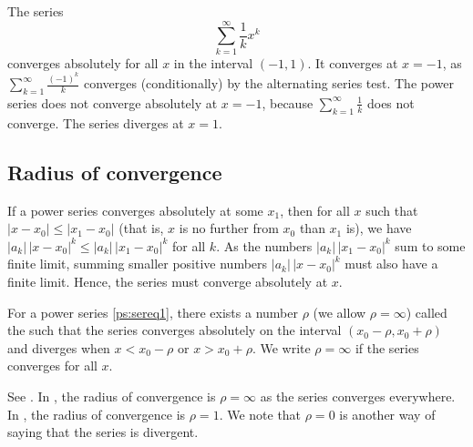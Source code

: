 \begin{example} \label{ps:1kex}
The series
\begin{equation*}
\sum_{k=1}^\infty \frac{1}{k} x^k
\end{equation*}
converges absolutely for all $x$ in the interval $(-1,1)$.
It converges at $x=-1$,
as
$\sum_{k=1}^\infty \frac{{(-1)}^k}{k}$ converges (conditionally)
by the alternating series
test.
The power series does not converge absolutely at $x=-1$, because
$\sum_{k=1}^\infty \frac{1}{k}$ does not converge.
The series
diverges at $x=1$.
\end{example}

\subsection{Radius of convergence}

If a power series converges absolutely
at some $x_1$, then for all $x$ such that
$\lvert x - x_0  \rvert \leq \lvert x_1 - x_0 \rvert$ (that is, $x$ is
no further from $x_0$ than $x_1$ is), we have
$\lvert a_k \rvert \, {\lvert x-x_0 \rvert}^k \leq
\lvert a_k \rvert \, { \lvert x_1-x_0 \rvert}^k$
for all $k$.
As the numbers $\lvert a_k \rvert \, {\lvert x_1-x_0 \rvert}^k$
sum to some finite
limit, summing smaller positive numbers
$\lvert a_k \rvert \, {\lvert x-x_0 \rvert}^k$
must also have a finite limit.
Hence, the series must converge
absolutely at $x$. %

\begin{theorem}
For a power series \eqref{ps:sereq1}, there exists a number
$\rho$ (we allow $\rho=\infty$)
called the \emph{} such that
the series converges absolutely on the interval
$(x_0-\rho,x_0+\rho)$ and diverges when $x < x_0-\rho$ or $x > x_0+\rho$.
We write $\rho=\infty$ if
the series converges for all $x$.
\end{theorem}

\begin{myfig}
\capstart
{}
\caption{Convergence of a power series.\label{ps:convfig}}
\end{myfig}

See .
In , the radius of convergence is $\rho = \infty$
as the series converges everywhere.
In , the radius of convergence is $\rho=1$.
We note that $\rho = 0$ is another way of saying that the series is
divergent.

